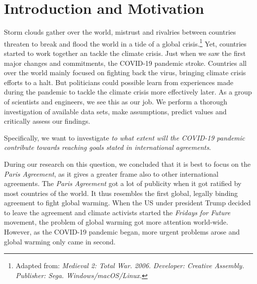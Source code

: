\section{Introduction and Motivation}



Storm clouds gather over the world, mistrust and rivalries between countries threaten to break and flood the world in a tide of a global crisis.\footnote{Adapted from: \textit{Medieval 2: Total War. 2006. Developer: Creative Assembly. Publisher: Sega. Windows/macOS/Linux.}} Yet, countries started to work together an tackle the climate crisis. Just when we saw the first major changes and commitments, the COVID-19 pandemic stroke. Countries all over the world mainly focused on fighting back the virus, bringing climate crisis efforts to a halt. But politicians could possible learn from experiences made during the pandemic to tackle the climate crisis more effectively later. As a group of scientists and engineers, we see this as our job. We perform a thorough investigation of available data sets, make assumptions, predict values and critically assess our findings.

Specifically, we want to investigate \textit{to what extent will the COVID-19 pandemic contribute towards reaching goals stated in international agreements}.

During our research on this question, we concluded that it is best to focus on the \textit{Paris Agreement}, as it gives a greater frame also to other international agreements. The \textit{Paris Agreement} got a lot of publicity when it got ratified by most countries of the world. It thus resembles the first global, legally binding agreement to fight global warming. When the US under president Trump decided to leave the agreement and climate activists started the \textit{Fridays for Future} movement, the problem of global warming got more attention world-wide. However, as the COVID-19 pandemic began, more urgent problems arose and global warming only came in second.

